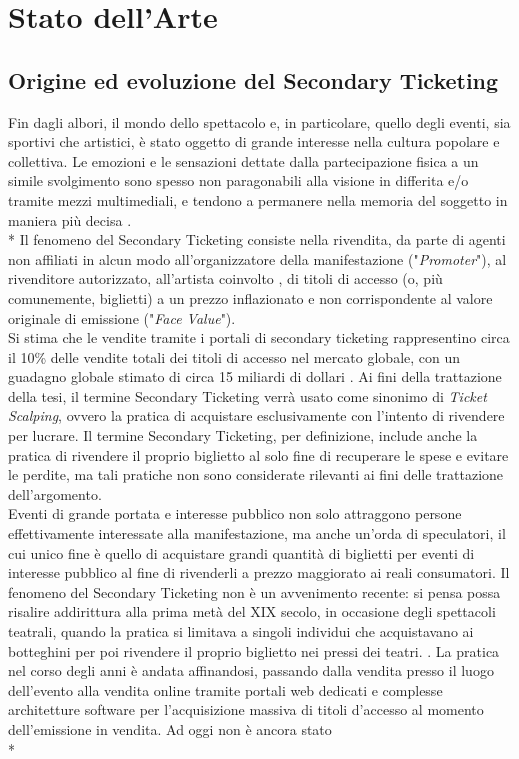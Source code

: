 \chapter{Stato dell'Arte}
\label{chap:stato_arte}

\section{Origine ed evoluzione del Secondary Ticketing}
Fin dagli albori, il mondo dello spettacolo e, in particolare, quello degli eventi, sia sportivi che artistici, è stato oggetto di grande interesse nella cultura popolare e collettiva. Le emozioni e le sensazioni dettate dalla partecipazione fisica a un simile svolgimento sono spesso non paragonabili alla visione in differita e/o tramite mezzi multimediali, e tendono a permanere nella memoria del soggetto in maniera più decisa \cite{ballantyne2014designing}. \\* %
Il fenomeno del Secondary Ticketing consiste nella rivendita, da parte di agenti non affiliati in alcun modo all'organizzatore della manifestazione ("\textit{Promoter}"), al rivenditore autorizzato, all'artista coinvolto \cite{courty2003some}, di titoli di accesso (o, più comunemente, biglietti) a un prezzo inflazionato e non corrispondente al valore originale di emissione ("\textit{Face Value}"). \\ Si stima che le vendite tramite i portali di secondary ticketing rappresentino circa il 10\% delle vendite totali dei titoli di accesso nel mercato globale, con un guadagno globale stimato di circa 15 miliardi di dollari \cite{tompkins2018ticket}.
Ai fini della trattazione della tesi, il termine Secondary Ticketing verrà usato come sinonimo di \textit{Ticket Scalping}, ovvero la pratica di acquistare esclusivamente con l'intento di rivendere per lucrare. Il termine Secondary Ticketing, per definizione, include anche la pratica di rivendere il proprio biglietto al solo fine di recuperare le spese e evitare le perdite, ma tali pratiche non sono considerate rilevanti ai fini delle trattazione dell'argomento. \\
Eventi di grande portata e interesse pubblico non solo attraggono persone effettivamente interessate alla manifestazione, ma anche un'orda di speculatori, il cui unico fine è quello di acquistare grandi quantità di biglietti per eventi di interesse pubblico al fine di rivenderli a prezzo maggiorato ai reali consumatori. 
Il fenomeno del Secondary Ticketing non è un avvenimento recente: si pensa possa risalire addirittura alla prima metà del XIX secolo, in occasione degli spettacoli teatrali, quando la pratica si limitava a singoli individui che acquistavano ai botteghini per poi rivendere il proprio biglietto nei pressi dei teatri. \cite{elefant2018beyond}. La pratica nel corso degli anni è andata affinandosi, passando dalla vendita presso il luogo dell'evento alla vendita online tramite portali web dedicati e complesse architetture software per l'acquisizione massiva di titoli d'accesso al momento dell'emissione in vendita. Ad oggi non è ancora stato\\*
